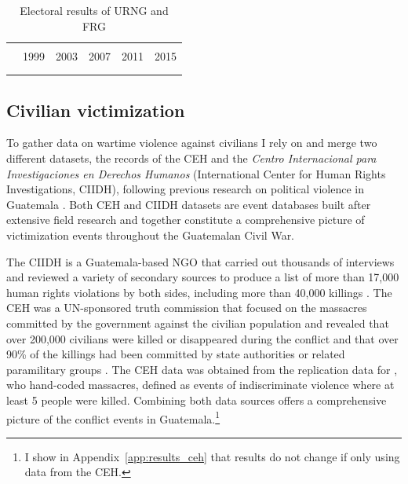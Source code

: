 \documentclass[12pt, notitlepage]{article}
\begin{document}
\vspace{15pt}
\begin{table}[!htbp] \centering
  \caption{Electoral results of URNG and FRG}\label{tab:elec_results}
  \small

  \begin{tabular}{lccccc}
  \\[-1.8ex]\hline
  \hline \\[-1.8ex]
    & 1999 & 2003 & 2007 & 2011 & 2015 \\
  \hline \\[-1.8ex]
  
  \hline
  \hline \\[-1.8ex]
  \end{tabular}

\end{table}

\subsection*{Civilian victimization}

To gather data on wartime violence against civilians I rely on and merge two different datasets, the records of the CEH and the \textit{Centro Internacional para Investigaciones en Derechos Humanos} (International Center for Human Rights Investigations, CIIDH), following previous research on political violence in Guatemala \citep{Chamarbagwala:2011aa, Sullivan:2012aa}.
Both CEH and CIIDH datasets are event databases built after extensive field research and together constitute a comprehensive picture of victimization events throughout the Guatemalan Civil War.

The CIIDH is a Guatemala-based NGO that carried out thousands of interviews and reviewed a variety of secondary sources to produce a list of more than 17,000 human rights violations by both sides, including more than 40,000 killings \citep{Ball:1999aa}.
The CEH was a UN-sponsored truth commission that focused on the massacres committed by the government against the civilian population and revealed that over 200,000 civilians were killed or disappeared during the conflict and that over 90\% of the killings had been committed by state authorities or related paramilitary groups \citep{CEH:1999aa}.
The CEH data was obtained from the replication data for \citet{Sullivan:2012aa}, who hand-coded massacres, defined as events of indiscriminate violence where at least 5 people were killed.
Combining both data sources offers a comprehensive picture of the conflict events in Guatemala.\footnote{I show in Appendix~\ref{app:results_ceh} that results do not change if only using data from the CEH.}
\end{document}
